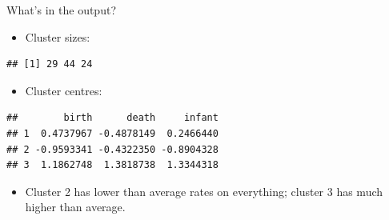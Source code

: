 \documentclass[ignorenonframetext,]{beamer}
\newenvironment{Shaded}{\begin{snugshade}}{\end{snugshade}}
\newcommand{\NormalTok}[1]{#1}
\newcommand{\OperatorTok}[1]{\textcolor[rgb]{0.81,0.36,0.00}{\textbf{#1}}}
\providecommand{\tightlist}{%
  \setlength{\itemsep}{0pt}\setlength{\parskip}{0pt}}
\begin{document}
\begin{frame}[fragile]{What's in the output?}
\protect\hypertarget{whats-in-the-output}{}

\begin{itemize}
\tightlist
\item
  Cluster sizes:
\end{itemize}

\begin{Shaded}
\end{Shaded}

\begin{verbatim}
## [1] 29 44 24
\end{verbatim}

\begin{itemize}
\tightlist
\item
  Cluster centres:
\end{itemize}

\begin{Shaded}
\end{Shaded}

\begin{verbatim}
##        birth      death     infant
## 1  0.4737967 -0.4878149  0.2466440
## 2 -0.9593341 -0.4322350 -0.8904328
## 3  1.1862748  1.3818738  1.3344318
\end{verbatim}

\begin{itemize}
\tightlist
\item
  Cluster 2 has lower than average rates on everything; cluster 3 has
  much higher than average.
\end{itemize}

\end{frame}
\end{document}
